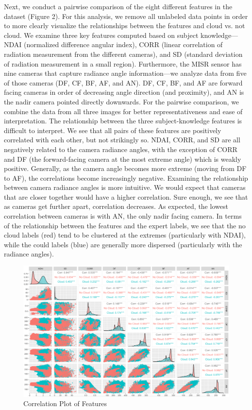 \documentclass[12pt]{article}
\begin{document}
\noindent Next, we conduct a pairwise comparison of the eight different features in the dataset (Figure 2). For this analysis, we remove all unlabeled data points in order to more clearly visualize the relationships between the features and cloud vs. not cloud. We examine three key features computed based on subject knowledge---NDAI (normalized difference angular index), CORR (linear correlation of radiation measurement from the different cameras), and SD (standard deviation of radiation measurement in a small region). Furthermore, the MISR sensor has nine cameras that capture radiance angle information---we analyze data from five of those cameras (DF, CF, BF, AF, and AN). DF, CF, BF, and AF are forward facing cameras in order of decreasing angle direction (and proximity), and AN is the nadir camera pointed directly downwards. For the pairwise comparison, we combine the data from all three images for better representativeness and ease of interpretation. 
\newline
\newline
The relationship between the three subject-knowledge features is difficult to interpret. We see that all pairs of these features are positively correlated with each other, but not strikingly so. NDAI, CORR, and SD are all negatively related to the camera radiance angles, with the exception of CORR and DF (the forward-facing camera at the most extreme angle) which is weakly positive. Generally, as the camera angle becomes more extreme (moving from DF to AF), the correlations become increasingly negative. Examining the relationship between camera radiance angles is more intuitive. We would expect that cameras that are closer together would have a higher correlation. Sure enough, we see that as cameras get further apart, correlation decreases. As expected, the lowest correlation between cameras is with AN, the only nadir facing camera. In terms of the relationship between the features and the expert labels, we see that the no cloud labels (red) tend to be clustered at the extremes (particularly with NDAI), while the could labels (blue) are generally more dispersed (particularly with the radiance angles). 

\begin{figure}[htp]
\caption{Correlation Plot of Features}
\includegraphics[width=16cm]{Fig2.png}
\centering
\end{figure}
\end{document}
